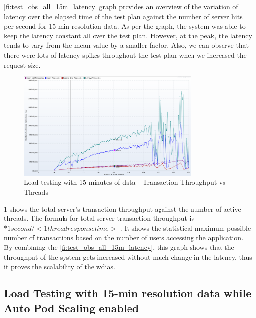 \cref{fi:test_obs_all_15m_latency} graph provides an overview of the variation of latency over the elapsed time of the test plan against the number of server hits per second for 15-min resolution data. As per the graph, the system was able to keep the latency constant all over the test plan. However, at the peak, the latency tends to vary from the mean value by a smaller factor. Also, we can observe that there were lots of latency spikes throughout the test plan when we increased the request size.

\begin{figure}[htp]
    \centering
    \includegraphics[width=0.8\textwidth]{results/obs/all/obs_all_15m_transaction_throughtput_vs_threads.png}
    \caption{Load testing with 15 minutes of data - Transaction Throughput vs Threads}
    \label{fi:test_obs_all_15m_throughtput}
\end{figure}

\cref{fi:test_obs_all_15m_throughtput} shows the total server's transaction throughput against the number of active threads.
The formula for total server transaction throughput is \(<active threads> * 1 second / <1  thread response time>\) \cite{JMeterPluginsTransactionPlugin}. It shows the statistical maximum possible number of transactions based on the number of users accessing the application.
By combining the \cref{fi:test_obs_all_15m_latency}, this graph shows that the throughput of the system gets increased without much change in the latency, thus it proves the scalability of the \acrshort{wdias}.


\subsection{Load Testing with 15-min resolution data while Auto Pod Scaling enabled}
\label{subse:obs_test_plan_all_auto_15min}

